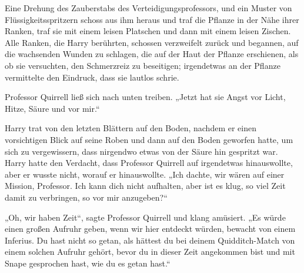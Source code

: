 Eine Drehung des Zauberstabs des Verteidigungsprofessors, und ein Muster von Flüssigkeitsspritzern schoss aus ihm heraus und traf die Pflanze in der Nähe ihrer Ranken, traf sie mit einem leisen Platschen und dann mit einem leisen Zischen.
Alle Ranken, die Harry berührten, schossen verzweifelt zurück und begannen, auf die wachsenden Wunden zu schlagen, die auf der Haut der Pflanze erschienen, als ob sie versuchten, den Schmerzreiz zu beseitigen; irgendetwas an der Pflanze vermittelte den Eindruck, dass sie lautlos schrie.

Professor Quirrell ließ sich nach unten treiben.
„Jetzt hat sie Angst vor Licht, Hitze, Säure und vor mir.“

Harry trat von den letzten Blättern auf den Boden, nachdem er einen vorsichtigen Blick auf seine Roben und dann auf den Boden geworfen hatte, um sich zu vergewissern, dass nirgendwo etwas von der Säure hin gespritzt war. Harry hatte den Verdacht, dass Professor Quirrell auf irgendetwas hinauswollte, aber er wusste nicht, worauf er hinauswollte.
„Ich dachte, wir wären auf einer Mission, Professor. Ich kann dich nicht aufhalten, aber ist es klug, so viel Zeit damit zu verbringen, so vor mir anzugeben?“

„Oh, wir haben Zeit“, sagte Professor Quirrell und klang amüsiert.
„Es würde einen großen Aufruhr geben, wenn wir hier entdeckt würden, bewacht von einem Inferius. Du hast nicht so getan, als hättest du bei deinem Quidditch-Match von einem solchen Aufruhr gehört, bevor du in dieser Zeit angekommen bist und mit Snape gesprochen hast, wie du es getan hast.“

